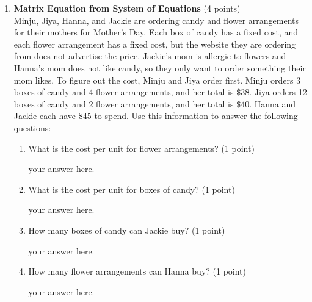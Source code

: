 \begin{enumerate}
  \newpage

  \item \textbf{Matrix Equation from System of Equations} (4 points)\\
  Minju, Jiya, Hanna, and Jackie are ordering 
  candy and flower arrangements for their mothers for 
  Mother's Day. Each box of candy has a fixed cost, 
  and each flower arrangement has a fixed cost, but the 
  website they are ordering from does not advertise the price. 
  Jackie's mom is allergic to flowers and Hanna's mom does not 
  like candy, so they only want to order something their mom 
  likes. To figure out the cost, Minju and Jiya order first. 
  Minju orders 3 boxes of candy and 4 flower arrangements, and 
  her total is \(\$38\). Jiya orders 12 boxes of candy and 2 
  flower arrangements, and her total is \(\$40\). Hanna and 
  Jackie each have \(\$45\) to spend. Use this information 
  to answer the following questions:
  \begin{enumerate}
    \item What is the cost per unit for flower arrangements? (1 point)
    \begin{subanswer}
      your answer here.
    \end{subanswer}
    \item What is the cost per unit for boxes of candy? (1 point)
    \begin{subanswer}
      your answer here.
    \end{subanswer}
    \item How many boxes of candy can Jackie buy? (1 point)
    \begin{subanswer}
      your answer here.
    \end{subanswer}
    \item How many flower arrangements can Hanna buy? (1 point)
    \begin{subanswer}
      your answer here.
    \end{subanswer}
  \end{enumerate}
  













\end{enumerate}
